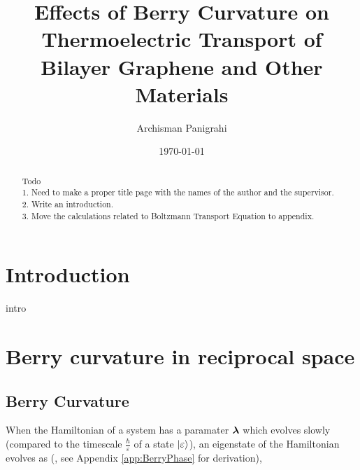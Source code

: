 \documentclass{report}
\renewcommand\vec[1]{\ensuremath\boldsymbol{#1}} %
\begin{document}
\title{\bf Effects of Berry Curvature on Thermoelectric Transport of Bilayer Graphene and Other Materials}


\author{Archisman Panigrahi}
%

\date{\today}




\maketitle

\begin{abstract}
Todo\\
1. Need to make a proper title page with the names of the author and the supervisor.\\
2. Write an introduction.\\
3. Move the calculations related to Boltzmann Transport Equation to appendix.
\end{abstract}
\tableofcontents



\newpage
\chapter{Introduction}
intro
\chapter{Berry curvature in reciprocal space}
\section{Berry Curvature}
When the Hamiltonian of a system has a paramater $\vec{\lambda}$ which evolves slowly (compared to the timescale $\frac{\hbar}{\varepsilon}$ of a state $\ket{\varepsilon}$), an eigenstate of the Hamiltonian evolves as (\cite{BerryQuantalPhase1984}, see Appendix \ref{app:BerryPhase} for derivation),
\end{document}
